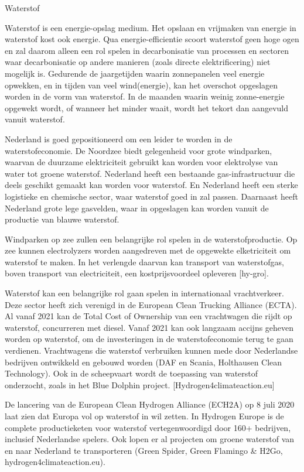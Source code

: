 \begin{voorstel}{Waterstof}
\begin{multicols*}{2}
\begin{overwegingen}
Waterstof is een energie-opslag medium. Het opslaan en vrijmaken van energie in waterstof kost ook energie. Qua energie-efficientie scoort waterstof geen hoge ogen en zal daarom alleen een rol spelen in decarbonisatie van processen en sectoren waar decarbonisatie op andere manieren (zoals directe elektrificering) niet mogelijk is. Gedurende de jaargetijden waarin zonnepanelen veel energie opwekken, en in tijden van veel wind(energie), kan het overschot opgeslagen worden in de vorm van waterstof. In de maanden waarin weinig zonne-energie opgewekt wordt, of wanneer het minder waait, wordt het tekort dan aangevuld vanuit waterstof.

Nederland is goed gepositioneerd om een leider te worden in de waterstofeconomie. De Noordzee biedt gelegenheid voor grote windparken, waarvan de duurzame elektriciteit gebruikt kan worden voor elektrolyse van water tot groene waterstof. Nederland heeft een bestaande gas-infrastructuur die deels geschikt gemaakt kan worden voor waterstof. En Nederland heeft een sterke logistieke en chemische sector, waar waterstof goed in zal passen. Daarnaast heeft Nederland grote lege gasvelden, waar \COO in opgeslagen kan worden vanuit de productie van blauwe waterstof.

Windparken op zee zullen een belangrijke rol spelen in de waterstofproductie. Op zee kunnen electrolyzers worden aangedreven met de opgewekte elketriciteit om waterstof te maken. In het verlengde daarvan kan transport van waterstofgas, boven transport van electriciteit, een kostprijsvoordeel opleveren [hy-gro].

Waterstof kan een belangrijke rol gaan spelen in internationaal vrachtverkeer. Deze sector heeft zich verenigd in de European Clean Trucking Alliance (ECTA). Al vanaf 2021 kan de Total Cost of Ownership van een vrachtwagen die rijdt op waterstof, concurreren met diesel. Vanaf 2021 kan ook langzaam accijns geheven worden op waterstof, om de investeringen in de waterstofeconomie terug te gaan verdienen. Vrachtwagens die waterstof verbruiken kunnen mede door Nederlandse bedrijven ontwikkeld en gebouwd worden (DAF en Scania, Holthausen Clean Technology). Ook in de scheepvaart wordt de toepassing van waterstof onderzocht, zoals in het Blue Dolphin project. [Hydrogen4climateaction.eu]

De lancering van de European Clean Hydrogen Alliance (ECH2A) op 8 juli 2020 laat zien dat Europa vol op waterstof in wil zetten. In Hydrogen Europe is de complete productieketen voor waterstof vertegenwoordigd door 160+ bedrijven, inclusief Nederlandse spelers. Ook lopen er al projecten om groene waterstof van en naar Nederland te transporteren (Green Spider, Green Flamingo \& H2Go, hydrogen4climateaction.eu).


\end{overwegingen}
\end{multicols*}
\end{voorstel}
